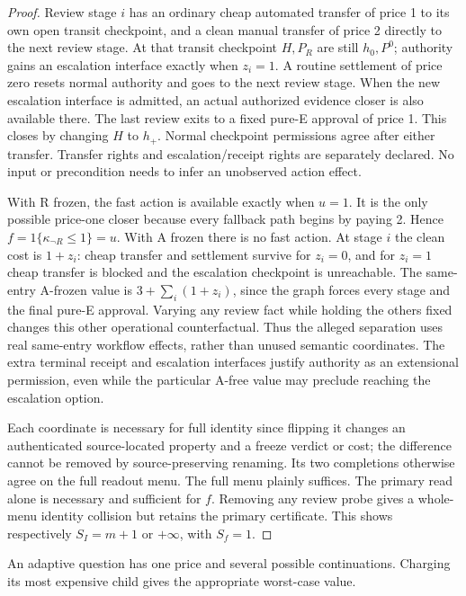 \begin{proof}
Review stage \(i\) has an ordinary cheap automated transfer of price 1 to its own open transit checkpoint, and a clean manual transfer of price 2 directly to the next review stage. At that transit checkpoint \(H,P_R\) are still \(h_0,P^0\); authority gains an escalation interface exactly when \(z_i=1\). A routine settlement of price zero resets normal authority and goes to the next review stage. When the new escalation interface is admitted, an actual authorized evidence closer is also available there. The last review exits to a fixed pure-E approval of price 1. This closes by changing \(H\) to \(h_+\). Normal checkpoint permissions agree after either transfer. Transfer rights and escalation/receipt rights are separately declared. No input or precondition needs to infer an unobserved action effect.

With R frozen, the fast action is available exactly when \(u=1\). It is the only possible price-one closer because every fallback path begins by paying 2. Hence \(f=1\{\kappa_{\neg R}\le1\}=u\). With A frozen there is no fast action. At stage \(i\) the clean cost is \(1+z_i\): cheap transfer and settlement survive for \(z_i=0\), and for \(z_i=1\) cheap transfer is blocked and the escalation checkpoint is unreachable. The same-entry A-frozen value is \(3+\sum_i(1+z_i)\), since the graph forces every stage and the final pure-E approval. Varying any review fact while holding the others fixed changes this other operational counterfactual. Thus the alleged separation uses real same-entry workflow effects, rather than unused semantic coordinates. The extra terminal receipt and escalation interfaces justify authority as an extensional permission, even while the particular A-free value may preclude reaching the escalation option.

Each coordinate is necessary for full identity since flipping it changes an authenticated source-located property and a freeze verdict or cost; the difference cannot be removed by source-preserving renaming. Its two completions otherwise agree on the full readout menu. The full menu plainly suffices. The primary read alone is necessary and sufficient for \(f\). Removing any review probe gives a whole-menu identity collision but retains the primary certificate. This shows respectively \(S_I=m+1\) or \(+\infty\), with \(S_f=1\).

\end{proof}

An adaptive question has one price and several possible continuations. Charging its most expensive child gives the appropriate worst-case value.

